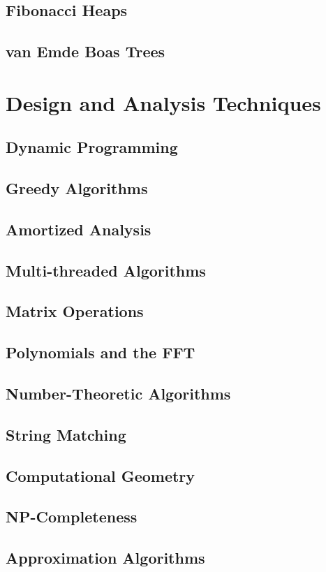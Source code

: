 		\section{Fibonacci Heaps}

		\section{van Emde Boas Trees}

	\chapter{Design and Analysis Techniques}
		\section{Dynamic Programming}

		\section{Greedy Algorithms}

		\section{Amortized Analysis}

		\section{Multi-threaded Algorithms}

		\section{Matrix Operations}

		\section{Polynomials and the FFT}

		\section{Number-Theoretic Algorithms}

		\section{String Matching}

		\section{Computational Geometry}

		\section{NP-Completeness}

		\section{Approximation Algorithms}
